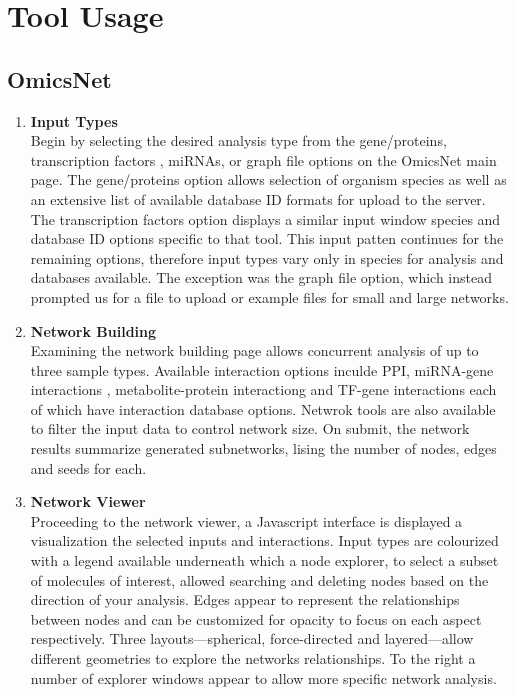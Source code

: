 \section{Tool Usage}

    \subsection{OmicsNet}
        \begin{enumerate}
            \item \textbf{Input Types} \\
            Begin by selecting the desired analysis type from the gene/proteins, transcription factors , miRNAs, or graph file options on the OmicsNet main page.\autocite{B21} The gene/proteins option allows selection of organism species as well as an extensive list of available database ID formats for upload to the server.\autocite{B21} The transcription factors option displays a similar input window species and database ID options specific to that tool.\autocite{B21} This input patten continues for the remaining options, therefore input types vary only in species for analysis and databases available. The exception was the graph file option, which instead prompted us for a file to upload or example files for small  and large  networks.\autocite{B21}


            \item \textbf{Network Building} \\
            
            Examining the network building page allows concurrent analysis of up to three sample types. Available interaction options inculde PPI, miRNA-gene interactions , metabolite-protein interactiong  and TF-gene interactions  each of which have interaction database options. Netwrok tools are also available to filter the input data to control network size. On submit, the network results summarize generated subnetworks, lising the number of nodes, edges and seeds for each.\autocite{B21}

            \item \textbf{Network Viewer} \\
            
            Proceeding to the network viewer, a Javascript interface is displayed a visualization the selected inputs and interactions.\autocite{B21} Input types are colourized with a legend available underneath which a node explorer, to select a subset of molecules of interest, allowed searching and deleting nodes based on the direction of your analysis.\autocite{B21} Edges appear to represent the relationships between nodes and can be customized for opacity to focus on each aspect respectively.\autocite{B21} Three layouts---spherical, force-directed and layered---allow different geometries to explore the networks relationships. To the right a number of explorer windows appear to allow more specific network analysis.\autocite{B21}
        \end{enumerate}

